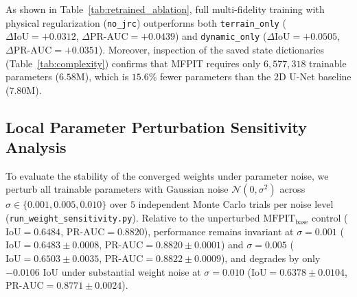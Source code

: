 \documentclass[journal]{IEEEtran}
\begin{document}
\begin{table}[!t]
\caption{Verified Architectural Parameter Counts and Asymptotic Complexity}
\label{tab:complexity}
\centering
{}
\end{table}

As shown in Table~\ref{tab:retrained_ablation}, full multi-fidelity training with physical regularization (\texttt{no\_jrc}) outperforms both \texttt{terrain\_only} ($\Delta\text{IoU} = +0.0312$, $\Delta\text{PR-AUC} = +0.0439$) and \texttt{dynamic\_only} ($\Delta\text{IoU} = +0.0505$, $\Delta\text{PR-AUC} = +0.0351$). Moreover, inspection of the saved state dictionaries (Table~\ref{tab:complexity}) confirms that MFPIT requires only $6,577,318$ trainable parameters ($6.58\text{M}$), which is $15.6\%$ fewer parameters than the 2D U-Net baseline ($7.80\text{M}$).

\subsection{Local Parameter Perturbation Sensitivity Analysis}
To evaluate the stability of the converged weights under parameter noise, we perturb all trainable parameters with Gaussian noise $\mathcal{N}(0, \sigma^2)$ across $\sigma \in \{0.001, 0.005, 0.010\}$ over $5$ independent Monte Carlo trials per noise level (\texttt{run\_weight\_sensitivity.py}). Relative to the unperturbed $\text{MFPIT}_{\text{base}}$ control ($\text{IoU} = 0.6484$, $\text{PR-AUC} = 0.8820$), performance remains invariant at $\sigma = 0.001$ ($\text{IoU} = 0.6483 \pm 0.0008$, $\text{PR-AUC} = 0.8820 \pm 0.0001$) and $\sigma = 0.005$ ($\text{IoU} = 0.6503 \pm 0.0035$, $\text{PR-AUC} = 0.8822 \pm 0.0009$), and degrades by only $-0.0106$ IoU under substantial weight noise at $\sigma = 0.010$ ($\text{IoU} = 0.6378 \pm 0.0104$, $\text{PR-AUC} = 0.8771 \pm 0.0024$).
\end{document}

